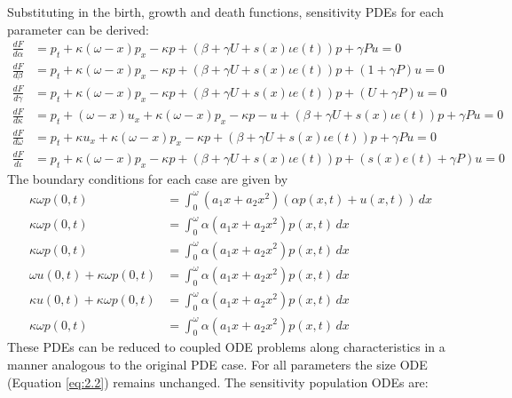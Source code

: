 \documentclass{article}
\begin{document}
Substituting in the birth, growth and death functions, sensitivity PDEs for each parameter can be derived:
\begin{subequations}
  \begin{align}
  \frac{d F}{d \alpha} &= p_t + \kappa(\omega-x)p_x - \kappa p + \left(\beta+\gamma U+s(x)\iota e(t)\right)p + \gamma P u = 0\\
  \frac{d F}{d \beta} &= p_t + \kappa(\omega-x)p_x - \kappa p + \left(\beta+\gamma U+s(x)\iota e(t)\right)p + \left(1+ \gamma P\right)u = 0 \\
  \frac{d F}{d \gamma} &= p_t + \kappa(\omega-x)p_x - \kappa p + \left(\beta+\gamma U+s(x)\iota e(t)\right)p + \left(U+ \gamma P\right)u = 0 \\
  \frac{d F}{d \kappa} &= p_t + (\omega-x)u_x + \kappa(\omega-x)p_x - \kappa p - u + \left(\beta+\gamma U+s(x)\iota e(t)\right)p + \gamma P u = 0 \\
  \frac{d F}{d \omega} &= p_t + \kappa u_x + \kappa(\omega-x)p_x - \kappa p + \left(\beta+\gamma U+s(x)\iota e(t)\right)p + \gamma P u = 0 \\  
  \frac{d F}{d \iota} &= p_t + \kappa(\omega-x)p_x - \kappa p + \left(\beta+\gamma U+s(x)\iota e(t)\right)p + \left(s(x)e(t)+\gamma P\right) u = 0 
  \end{align}
\end{subequations}
The boundary conditions for each case are given by
\begin{subequations}
  \begin{align}
    \kappa\omega p(0,t) &= \int_0^\omega \left(a_1 x + a_2 x^2\right) \left(\alpha p(x,t) + u(x,t)\right)\,dx \\
    \kappa\omega p(0,t) &= \int_0^\omega \alpha \left(a_1 x + a_2 x^2\right) p(x,t) \,dx \\
    \kappa\omega p(0,t) &= \int_0^\omega \alpha \left(a_1 x + a_2 x^2\right) p(x,t) \,dx \\
    \omega u(0,t) + \kappa\omega p(0,t) &= \int_0^\omega \alpha \left(a_1 x + a_2 x^2\right) p(x,t) \,dx \\
    \kappa u(0,t) + \kappa\omega p(0,t) &= \int_0^\omega \alpha \left(a_1 x + a_2 x^2\right) p(x,t) \,dx \\
    \kappa\omega p(0,t) &= \int_0^\omega \alpha \left(a_1 x + a_2 x^2\right) p(x,t)  \,dx  
  \end{align}
\end{subequations}
These PDEs can be reduced to coupled ODE problems along characteristics in a manner analogous to the original PDE case. For all parameters the size ODE (Equation \ref{eq:2.2}) remains unchanged. The sensitivity population ODEs are:
\end{document}
